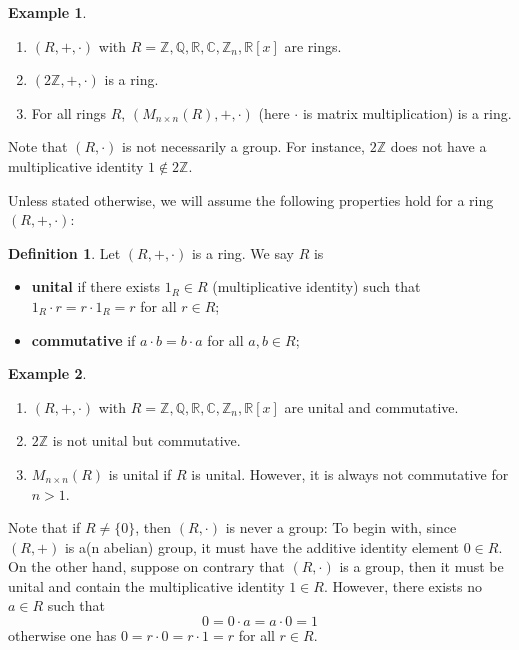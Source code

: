 \documentclass[11pt,openany]{book}
\theoremstyle{plain}
\theoremstyle{definition}
\newtheorem{definition}[definition]{Definition}
\newtheorem{example}[example]{Example}
\theoremstyle{remark}
\begin{document}
\begin{example}
    \begin{enumerate}
        \item $(R,+,\cdot)$ with $R = \mathbb{Z}, \mathbb{Q}, \mathbb{R}, \mathbb{C}, \mathbb{Z}_n, \mathbb{R}[x]$ are rings.
        \item $(2\mathbb{Z},+,\cdot)$ is a ring.
        \item For all rings $R$, $(M_{n\times n}(R),+,\cdot)$ (here $\cdot$ is matrix multiplication) is a ring.
    \end{enumerate}
\end{example}

Note that $(R, \cdot)$ is not necessarily a group. For instance, $2\mathbb{Z}$ does not have a multiplicative identity $1 \notin 2\mathbb{Z}$. 

Unless stated otherwise, we will assume the following properties hold for a ring $(R,+,\cdot)$:
\begin{definition}
Let $(R,+,\cdot)$ is a ring. We say $R$ is 
\begin{itemize}
    \item {\bf unital} if there exists $1_R \in R$ (multiplicative identity) such that $1_R\cdot r=r\cdot 1_R=r$ for all $r\in R$;
    \item {\bf commutative} if $a \cdot b = b \cdot a$ for all $a, b \in R$;
\end{itemize}
\end{definition}

\begin{example}\
\begin{enumerate}
    \item $(R,+,\cdot)$ with $R = \mathbb{Z}, \mathbb{Q}, \mathbb{R}, \mathbb{C}, \mathbb{Z}_n, \mathbb{R}[x]$ are unital and commutative.
    \item $2\mathbb{Z}$ is not unital but commutative.
    \item $M_{n\times n}(R)$ is unital if $R$ is unital. However, it is always not commutative for $n > 1$.
\end{enumerate}
\end{example}

Note that if $R \neq \{0\}$, then $(R,\cdot)$ is never a group: To begin with, since $(R,+)$ is a(n abelian) group, it must have the additive identity element $0 \in R$. On the other hand, suppose on contrary that $(R,\cdot)$ is a group, then it must be unital and contain the multiplicative identity $1 \in R$. However, there exists no $a \in R$ such that
$$0 = 0 \cdot a = a \cdot 0 = 1$$
otherwise one has $0 = r \cdot 0 = r \cdot 1 = r$ for all $r \in R$.
\end{document}
